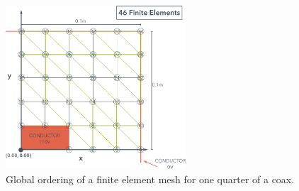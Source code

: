\documentclass[11pt]{amsart}
\begin{document}
\begin{figure}[h]
    \includegraphics[width=0.6\textwidth]{assets/q2_mesh.png}
    \caption{Global ordering of a finite element mesh for one quarter of a coax.}
    \label{fig:q2_mesh}
\end{figure}
\end{document}
